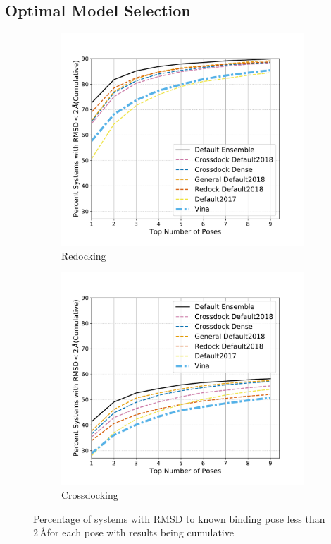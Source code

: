 \documentclass[journal=jcisd8,manuscript=article]{achemso}
\begin{document}
\subsection{Optimal Model Selection}
\begin{figure}
	\begin{subfigure}[b]{0.48\textwidth}
		\centering
		\includegraphics[width=\textwidth]{figures/redocking/rescore_single_models_line.pdf}
		\caption{Redocking}
		\label{fig:RescoreSingleRedock}
        \end{subfigure}    
	\begin{subfigure}[b]{0.48\textwidth}    
		\centering
		\includegraphics[width=\textwidth]{figures/crossdocking/rescore_single_models_line.pdf}
		\caption{Crossdocking}
		\label{fig:RescoreSingleCrossdock}
        \end{subfigure}    
	\caption{Percentage of systems with RMSD to known binding pose less than $2\,$\AA for each pose with results being cumulative}
	\label{fig:RescoreSingle}
\end{figure}    
\end{document}

